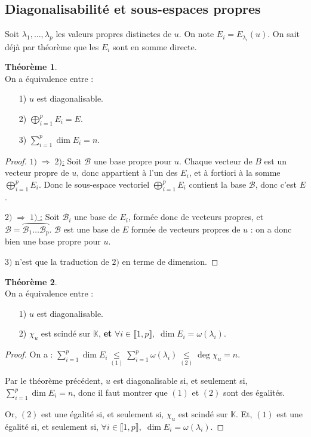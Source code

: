\documentclass[12pt]{book}
\let\ensembleNombre\mathbb
\newcommand*\K{\ensuremath{\ensembleNombre{K}}}
\newcommand*\B{\ensuremath{\mathcal B}}
\theoremstyle{definition}
\newtheorem{thme}{Théorème}[chapter]
\theoremstyle{remark}
\newenvironment{fthme}
  {\begin{mdframed}[roundcorner=10pt, linewidth=2pt]\begin{thme}}
  {\end{thme}\end{mdframed}}
\begin{document}
	\subsection{Diagonalisabilité et sous-espaces propres}
	Soit $\lambda_1, \ldots, \lambda_p$ les valeurs propres distinctes de $u$. On note $E_i = E_{\lambda_i}(u)$. On sait déjà par théorème que les $E_i$ sont en somme directe. 
	\begin{fthme}\mbox{~}\\
	On a équivalence entre :
	\begin{itemize}
	\item[1)] $u$ est diagonalisable.
	\item[2)] $\bigoplus_{i=1}^p E_i = E$.
	\item[3)] $\sum_{i=1}^p \dim E_i = n$.
	\end{itemize}
	\end{fthme}
	
	\begin{proof}
	\underline{$1) \;\Longrightarrow \; 2)$:} Soit $\B$ une base propre pour $u$. Chaque vecteur de $B$ est un vecteur propre de $u$, donc appartient à l'un des $E_i$, et à fortiori à la somme $\bigoplus_{i=1}^p E_i$. Donc le sous-espace vectoriel $\bigoplus_{i=1}^p E_i$ contient la base $\mathcal B$, donc c'est $E$.
	
	\underline{$2) \; \Longrightarrow \; 1)$ :} Soit $\B_i$ une base de $E_i$, formée donc de vecteurs propres, et $\B = \wideparen{\B_1\ldots \B_p}$. $\B$ est une base de $E$ formée de vecteurs propres de $u$ : on a donc bien une base propre pour $u$.
	
	\underline{$3)$} n'est que la traduction de $2)$ en terme de dimension.
	\end{proof}
	
	\begin{fthme}\mbox{~}\\
	On a équivalence entre :
	\begin{itemize}
	\item[1)] $u$ est diagonalisable.
	\item[2)] $\chi_u$ est scindé sur $\K$, \textbf{et} $\forall i \in \llbracket 1, p \rrbracket,\; \dim E_i = \omega(\lambda_i)$.
	\end{itemize}
	\end{fthme}
	
	\begin{proof}
	On a : $\sum_{i=1}^p \dim E_i \underset{(1)}{\leq} \sum_{i=1}^p \omega(\lambda_i) \underset{(2)}{\leq} \deg \chi_u = n$.
	
	Par le théorème précédent, $u$ est diagonalisable si, et seulement si, $\sum_{i=1}^p \dim E_i = n$, donc il faut montrer que $(1)$ et $(2)$ sont des égalités.
	
	Or, $(2)$ est une égalité si, et seulement si, $\chi_u$ est scindé sur $\K$. Et, $(1)$ est une égalité si, et seulement si, $\forall i \in \llbracket 1, p \rrbracket, \; \dim E_i = \omega(\lambda_i)$.	
	\end{proof}
	
\end{document}
